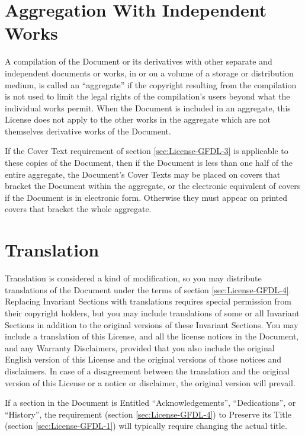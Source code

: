 \section{Aggregation With Independent Works}
\label{sec:License-GFDL-7}

A compilation of the Document or its derivatives with other separate
and independent documents or works, in or on a volume of a storage or
distribution medium, is called an ``aggregate'' if the copyright
resulting from the compilation is not used to limit the legal rights
of the compilation's users beyond what the individual works permit.
When the Document is included in an aggregate, this License does not
apply to the other works in the aggregate which are not themselves
derivative works of the Document.

If the Cover Text requirement of section \ref{sec:License-GFDL-3} is
applicable to these copies of the Document, then if the Document is
less than one half of the entire aggregate, the Document's Cover Texts
may be placed on covers that bracket the Document within the
aggregate, or the electronic equivalent of covers if the Document is
in electronic form.  Otherwise they must appear on printed covers that
bracket the whole aggregate.

\section{Translation}
\label{sec:License-GFDL-8}

Translation is considered a kind of modification, so you may
distribute translations of the Document under the terms of section
\ref{sec:License-GFDL-4}.  Replacing Invariant Sections with
translations requires special permission from their copyright holders,
but you may include translations of some or all Invariant Sections in
addition to the original versions of these Invariant Sections.  You
may include a translation of this License, and all the license notices
in the Document, and any Warranty Disclaimers, provided that you also
include the original English version of this License and the original
versions of those notices and disclaimers.  In case of a disagreement
between the translation and the original version of this License or a
notice or disclaimer, the original version will prevail.

If a section in the Document is Entitled ``Acknowledgements'',
``Dedications'', or ``History'', the requirement (section
\ref{sec:License-GFDL-4}) to Preserve its Title (section
\ref{sec:License-GFDL-1}) will typically require changing the actual
title.


